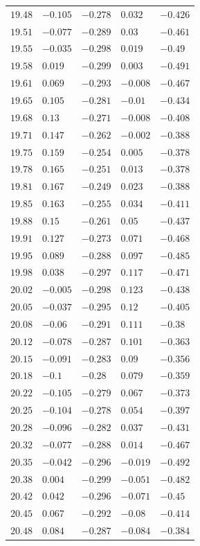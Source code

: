 \begin{table}[h]
\begin{tabular}{rllll}
$19.48$&$-0.105$&$-0.278$&$0.032$&$-0.426$\\
$19.51$&$-0.077$&$-0.289$&$0.03$&$-0.461$\\
$19.55$&$-0.035$&$-0.298$&$0.019$&$-0.49$\\
$19.58$&$0.019$&$-0.299$&$0.003$&$-0.491$\\
$19.61$&$0.069$&$-0.293$&$-0.008$&$-0.467$\\
$19.65$&$0.105$&$-0.281$&$-0.01$&$-0.434$\\
$19.68$&$0.13$&$-0.271$&$-0.008$&$-0.408$\\
$19.71$&$0.147$&$-0.262$&$-0.002$&$-0.388$\\
$19.75$&$0.159$&$-0.254$&$0.005$&$-0.378$\\
$19.78$&$0.165$&$-0.251$&$0.013$&$-0.378$\\
$19.81$&$0.167$&$-0.249$&$0.023$&$-0.388$\\
$19.85$&$0.163$&$-0.255$&$0.034$&$-0.411$\\
$19.88$&$0.15$&$-0.261$&$0.05$&$-0.437$\\
$19.91$&$0.127$&$-0.273$&$0.071$&$-0.468$\\
$19.95$&$0.089$&$-0.288$&$0.097$&$-0.485$\\
$19.98$&$0.038$&$-0.297$&$0.117$&$-0.471$\\
$20.02$&$-0.005$&$-0.298$&$0.123$&$-0.438$\\
$20.05$&$-0.037$&$-0.295$&$0.12$&$-0.405$\\
$20.08$&$-0.06$&$-0.291$&$0.111$&$-0.38$\\
$20.12$&$-0.078$&$-0.287$&$0.101$&$-0.363$\\
$20.15$&$-0.091$&$-0.283$&$0.09$&$-0.356$\\
$20.18$&$-0.1$&$-0.28$&$0.079$&$-0.359$\\
$20.22$&$-0.105$&$-0.279$&$0.067$&$-0.373$\\
$20.25$&$-0.104$&$-0.278$&$0.054$&$-0.397$\\
$20.28$&$-0.096$&$-0.282$&$0.037$&$-0.431$\\
$20.32$&$-0.077$&$-0.288$&$0.014$&$-0.467$\\
$20.35$&$-0.042$&$-0.296$&$-0.019$&$-0.492$\\
$20.38$&$0.004$&$-0.299$&$-0.051$&$-0.482$\\
$20.42$&$0.042$&$-0.296$&$-0.071$&$-0.45$\\
$20.45$&$0.067$&$-0.292$&$-0.08$&$-0.414$\\
$20.48$&$0.084$&$-0.287$&$-0.084$&$-0.384$\\

\end{tabular}
\end{table}
